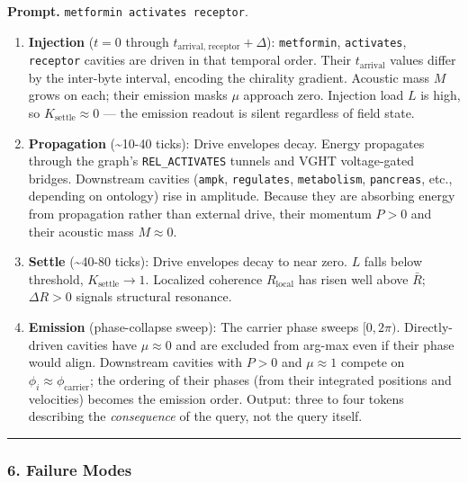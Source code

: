 \documentclass[
  11pt,
  a4paper,
]{article}
\providecommand{\tightlist}{%
  \setlength{\itemsep}{0pt}\setlength{\parskip}{0pt}}
\begin{document}
\textbf{Prompt.} \texttt{metformin\ activates\ receptor}.

\begin{enumerate}
\def\labelenumi{\arabic{enumi}.}
\tightlist
\item
  \textbf{Injection} (\(t = 0\) through
  \(t_{\text{arrival, receptor}} + \Delta\)): \texttt{metformin},
  \texttt{activates}, \texttt{receptor} cavities are driven in that
  temporal order. Their \(t_{\text{arrival}}\) values differ by the
  inter-byte interval, encoding the chirality gradient. Acoustic mass
  \(M\) grows on each; their emission masks \(\mu\) approach zero.
  Injection load \(L\) is high, so \(K_{\text{settle}} \approx 0\) ---
  the emission readout is silent regardless of field state.
\item
  \textbf{Propagation} (\textasciitilde10-40 ticks): Drive envelopes
  decay. Energy propagates through the graph's \texttt{REL\_ACTIVATES}
  tunnels and VGHT voltage-gated bridges. Downstream cavities
  (\texttt{ampk}, \texttt{regulates}, \texttt{metabolism},
  \texttt{pancreas}, etc., depending on ontology) rise in amplitude.
  Because they are absorbing energy from propagation rather than
  external drive, their momentum \(P > 0\) and their acoustic mass
  \(M \approx 0\).
\item
  \textbf{Settle} (\textasciitilde40-80 ticks): Drive envelopes decay to
  near zero. \(L\) falls below threshold, \(K_{\text{settle}} \to 1\).
  Localized coherence \(R_{\text{local}}\) has risen well above
  \(\bar R\); \(\Delta R > 0\) signals structural resonance.
\item
  \textbf{Emission} (phase-collapse sweep): The carrier phase sweeps
  \([0, 2\pi)\). Directly-driven cavities have \(\mu \approx 0\) and are
  excluded from arg-max even if their phase would align. Downstream
  cavities with \(P > 0\) and \(\mu \approx 1\) compete on
  \(\phi_i \approx \phi_{\text{carrier}}\); the ordering of their phases
  (from their integrated positions and velocities) becomes the emission
  order. Output: three to four tokens describing the \emph{consequence}
  of the query, not the query itself.
\end{enumerate}

\begin{center}\rule{0.5\linewidth}{0.5pt}\end{center}

\subsubsection{6. Failure Modes}\label{failure-modes-1}
\end{document}
